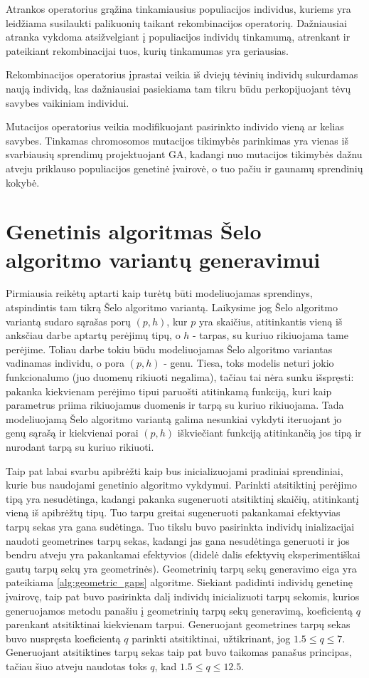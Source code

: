 \documentclass{VUMIFInfBakalaurinis}
\begin{document}
Atrankos operatorius grąžina tinkamiausius populiacijos individus, kuriems yra leidžiama susilaukti palikuonių taikant rekombinacijos operatorių.
Dažniausiai atranka vykdoma atsižvelgiant į populiacijos individų tinkamumą, atrenkant ir pateikiant rekombinacijai tuos, kurių tinkamumas yra geriausias.

Rekombinacijos operatorius įprastai veikia iš dviejų tėvinių individų sukurdamas naują individą, kas dažniausiai pasiekiama
tam tikru būdu perkopijuojant tėvų savybes vaikiniam individui.

Mutacijos operatorius veikia modifikuojant pasirinkto individo vieną ar kelias savybes.
Tinkamas chromosomos mutacijos tikimybės parinkimas yra vienas iš svarbiausių sprendimų projektuojant GA,
kadangi nuo mutacijos tikimybės dažnu atveju priklauso populiacijos genetinė įvairovė, o tuo pačiu ir gaunamų sprendinių kokybė.

\section{Genetinis algoritmas Šelo algoritmo variantų generavimui}

Pirmiausia reikėtų aptarti kaip turėtų būti modeliuojamas sprendinys, atspindintis tam tikrą Šelo algoritmo variantą.
Laikysime jog Šelo algoritmo variantą sudaro sąrašas porų $(p, h)$, kur $p$ yra skaičius, atitinkantis vieną iš anksčiau darbe aptartų perėjimų tipų,
o $h$ - tarpas, su kuriuo rikiuojama tame perėjime.
Toliau darbe tokiu būdu modeliuojamas Šelo algoritmo variantas vadinamas individu, o pora $(p, h)$ - genu.
Tiesa, toks modelis neturi jokio funkcionalumo (juo duomenų rikiuoti negalima), tačiau tai nėra sunku išspręsti: pakanka kiekvienam perėjimo tipui
paruošti atitinkamą funkciją, kuri kaip parametrus priima rikiuojamus duomenis ir tarpą su kuriuo rikiuojama.
Tada modeliuojamą Šelo algoritmo variantą galima nesunkiai vykdyti iteruojant jo genų sąrašą ir kiekvienai porai $(p, h)$ iškviečiant funkciją atitinkančią jos tipą ir nurodant tarpą su kuriuo rikiuoti.

Taip pat labai svarbu apibrėžti kaip bus inicializuojami pradiniai sprendiniai, kurie bus naudojami genetinio algoritmo vykdymui.
Parinkti atsitiktinį perėjimo tipą yra nesudėtinga, kadangi pakanka sugeneruoti atsitiktinį skaičių, atitinkantį vieną iš apibrėžtų tipų.
Tuo tarpu greitai sugeneruoti pakankamai efektyvias tarpų sekas yra gana sudėtinga.
Tuo tikslu buvo pasirinkta individų inializacijai naudoti geometrines tarpų sekas, kadangi jas gana nesudėtinga generuoti
ir jos bendru atveju yra pakankamai efektyvios (didelė dalis efektyvių eksperimentiškai gautų tarpų sekų yra geometrinės).
Geometrinių tarpų sekų generavimo eiga yra pateikiama \ref{alg:geometric_gaps} algoritme.
Siekiant padidinti individų genetinę įvairovę, taip pat buvo pasirinkta dalį individų inicializuoti
tarpų sekomis, kurios generuojamos metodu panašiu į geometrinių tarpų sekų generavimą, koeficientą $q$ parenkant atsitiktinai kiekvienam tarpui.
Generuojant geometrines tarpų sekas buvo nuspręsta koeficientą $q$ parinkti atsitiktinai, užtikrinant, jog $1.5 \leq q \leq 7$.
Generuojant atsitiktines tarpų sekas taip pat buvo taikomas panašus principas, tačiau šiuo atveju naudotas toks $q$, kad $1.5 \leq q \leq 12.5$.
\end{document}
